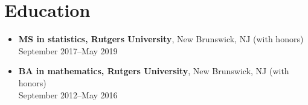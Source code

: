 \documentclass[letterpaper,10pt]{article}
\begin{document}
\section*{Education}

\begin{itemize}
  \item \textbf{MS in statistics, Rutgers University}, New Brunswick, NJ (with honors) \\
        September 2017--May 2019
  \item \textbf{BA in mathematics, Rutgers University}, New Brunswick, NJ (with honors) \\
        September 2012--May 2016
\end{itemize}


\scalebox{0.1}{\color{white}{}}

\scalebox{0.1}{\color{white}{}}
\end{document}
